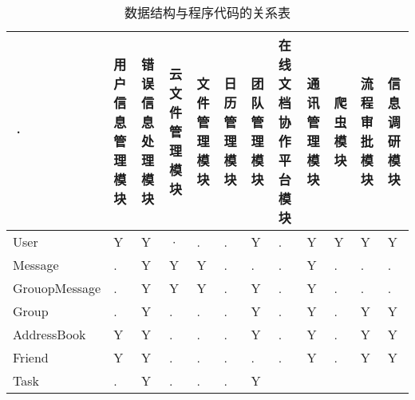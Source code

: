 {\color{red}  
        \begin{table}[htbp]
            \centering
            \caption{{\color{red}数据结构与程序代码的关系表}}
            \label{tab:datastructure-module}
            \begin{tabular}{|p{6.3em}|p{2em}|p{2em}|p{2em}|p{2em}|p{2em}|
                            p{2em}|p{2em}|p{2em}|p{2em}|p{2em}|p{2em}|}
                \hline %
            ·   & 用户信息管理模块      & 错误信息处理模块  & 云文件管理模块 
                & 文件管理模块          & 日历管理模块      & 团队管理模块      
                & 在线文档协作平台模块  & 通讯管理模块      &
                爬虫模块
                & 流程审批模块          & 信息调研模块
                \\
                \hline
                User                & Y   & Y     & · 
                                    & .   & .     & Y
                                    & .   & Y     & Y
                                    & Y   & Y     \\
                \hline
                Message             & .   & Y     & Y 
                                    & Y   & .     & .
                                    & .   & Y     & .
                                    & .   & .     \\
                \hline
                GrouopMessage       & .   & Y     & Y 
                                    & Y   & .     & Y
                                    & .   & Y     & .
                                    & .   & .     \\
                \hline
                Group               & .   & Y     & . 
                                    & .   & .     & Y
                                    & .   & Y     & .
                                    & Y   & Y     \\
                \hline
                AddressBook         & Y   & Y     & . 
                                    & .   & .     & Y
                                    & .   & Y     & .
                                    & Y   & Y     \\
                \hline
                Friend              & Y   & Y     & . 
                                    & .   & .     & .
                                    & .   & Y     & .
                                    & Y   & Y     \\
                \hline
                Task                & .   & Y     & . 
                                    & .   & .     & Y

\end{tabular}
\end{table}}
